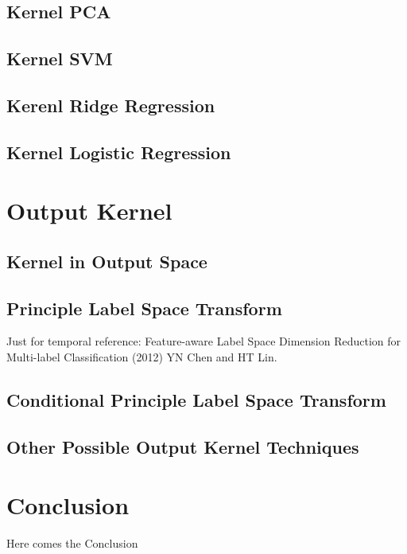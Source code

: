 \documentclass[12pt]{article}
\theoremstyle{definition}
\theoremstyle{remark}
\begin{document}
\subsection{Kernel PCA}
\subsection{Kernel SVM}
\subsection{Kerenl Ridge Regression}
\subsection{Kernel Logistic Regression}

\section{Output Kernel}
\subsection{Kernel in Output Space}
\subsection{Principle Label Space Transform}
Just for temporal reference: Feature-aware Label Space Dimension Reduction for Multi-label Classification (2012) YN Chen and HT Lin.
\subsection{Conditional Principle Label Space Transform}
\subsection{Other Possible Output Kernel Techniques}

\section{Conclusion}
Here comes the Conclusion






\end{document}
